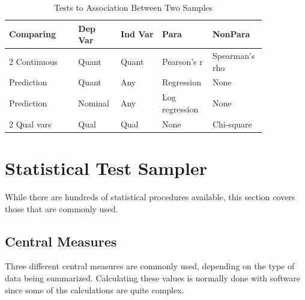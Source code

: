 \begin{table}[H]
	\centering
	\begin{tabularx}{0.95\linewidth}{p{0.25\linewidth}
			p{0.15\linewidth}
			p{0.15\linewidth}
			p{0.15\linewidth}
			p{0.15\linewidth}
		}
		\toprule
		\textbf{Comparing} & 
		\textbf{Dep Var} & 
		\textbf{Ind Var} &
		\textbf{Para} & 
		\textbf{NonPara} \\
		\midrule
		2 Continuous & Quant & Quant & Pearson's r & Spearman's rho \\
		Prediction & Quant & Any & Regression & None \\
		Prediction & Nominal & Any & Log \newline regression & None \\	
		2 Qual vars & Qual & Qual & None & Chi-square \\		
		
		\bottomrule
	\end{tabularx}
	\caption{Tests to Association Between Two Samples}
	\label{tab06.08}
\end{table}


\section{Statistical Test Sampler}

While there are hundreds of statistical procedures available, this section covers those that are commonly used.

\subsection{Central Measures}

Three different central measures are commonly used, depending on the type of data being summarized. Calculating these values is normally done with software since some of the calculations are quite complex.

